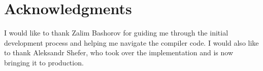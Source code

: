 \chapter*{Acknowledgments}

I would like to thank Zalim Bashorov for guiding me through the initial development process and helping me navigate the
compiler code. I would also like to thank Aleksandr Shefer, who took over the implementation and is now bringing it to
production.